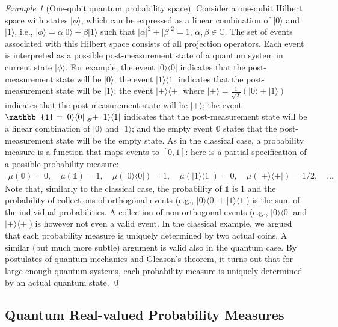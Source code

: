 \documentclass{article}
\theoremstyle{remark}
\newtheorem{example}{Example}
\newcommand{\ket}[1]{|#1\rangle}
\newcommand{\proj}[1]{|#1 \rangle\langle #1 |}
\newcommand{\ps}{\texttt{+}}
\def\C{{\mathbb{C}}}
\begin{document}
\begin{example}[One-qubit quantum probability space] Consider
a one-qubit Hilbert space with states $\ket{\phi}$, which can be
expressed as a linear combination of $\ket{0}$ and $\ket{1}$, i.e.,
$\ket{\phi}=\alpha\ket{0}+\beta\ket{1}$ such that $|\alpha|^{2}+|\beta|^{2}=1$,
$\alpha,\beta\in\C$. The set of events associated with this Hilbert
space consists of all projection operators. Each event is interpreted
as a possible post-measurement state of a quantum system in current
state $\ket{\phi}$. For example, the event $\proj{0}$ indicates
that the post-measurement state will be $\ket{0}$; the event $\proj{1}$
indicates that the post-measurement state will be $\ket{1}$; the
event $\proj{\ps}$ where $\ket{\ps}=\frac{1}{\sqrt{2}}(\ket{0}+\ket{1})$
indicates that the post-measurement state will be $\ket{\ps}$; the
event $\mathbb{1}=\proj{0}\tensor*[_{\mathscr{O}}]{+}{}\proj{1}$
indicates that the post-measurement state will be a linear combination
of $\ket{0}$ and $\ket{1}$; and the empty event $\mathbb{0}$ states
that the post-measurement state will be the empty state. As in the
classical case, a probability measure is a function that maps events
to $[0,1]$: here is a partial specification of a possible probability
measure: 
\[
\begin{array}{rcl}
\mu\left(\mathbb{0}\right)=0,\quad\mu\left(\mathbb{1}\right)=1,\quad\mu\left(\proj{0}\right)=1,\quad\mu\left(\proj{1}\right)=0,\quad\mu\left(\proj{\ps}\right)=1/2,\quad\ldots\end{array}
\]
Note that, similarly to the classical case, the probability of $\mathbb{1}$
is 1 and the probability of collections of orthogonal events (e.g.,
$\proj{0}+\proj{1}$) is the sum of the individual probabilities.
A collection of non-orthogonal events (e.g., $\proj{0}$ and $\proj{\ps}$)
is however not even a valid event. In the classical example, we argued
that each probability measure is uniquely determined by two actual
coins. A similar (but much more subtle) argument is valid also in
the quantum case. By postulates of quantum mechanics and Gleason's
theorem, it turns out that for large enough quantum systems, each
probability measure is uniquely determined by an actual quantum state.
\qed\end{example}



\subsection{Quantum Real-valued Probability Measures}
\end{document}
